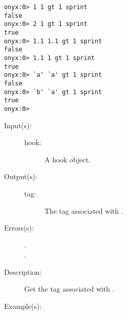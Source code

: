 \begin{description}
\begin{description}
\begin{verbatim}
onyx:0> 1 1 gt 1 sprint
false
onyx:0> 2 1 gt 1 sprint
true
onyx:0> 1.1 1.1 gt 1 sprint
false
onyx:0> 1.1 1 gt 1 sprint
true
onyx:0> `a' `a' gt 1 sprint
false
onyx:0> `b' `a' gt 1 sprint
true
onyx:0>
		\end{verbatim}
	\end{description}
\label{systemdict:hooktag}
\item[{\onyxop{hook}{hooktag}{tag}}: ]
	\begin{description}\item[]
	\item[Input(s): ]
		\begin{description}\item[]
		\item[hook: ]
			A hook object.
		\end{description}
	\item[Output(s): ]
		\begin{description}\item[]
		\item[tag: ]
			The tag associated with .
		\end{description}
	\item[Errors(s): ]
		\begin{description}\item[]
		\item[.]
		\item[.]
		\end{description}
	\item[Description: ]
		Get the tag associated with .
	\item[Example(s): ]\begin{verbatim}


\end{verbatim}
\end{description}
\end{description}
